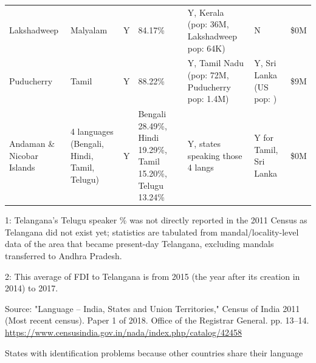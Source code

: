 \documentclass[doublespace,nopageskip]{UVAthesis}
\begin{document}
\begin{appendices}
\begin{table}[htbp]
\begin{threeparttable}
\begin{tabularx}{\textwidth}{@{}Y Y Z Z Y Y Y@{}}
Lakshadweep & Malyalam & Y & 84.17\% & Y, Kerala  (pop: 36M, Lakshadweep pop: 64K) & N & \$0M \\
Puducherry & Tamil & Y & 88.22\% & Y, Tamil Nadu  (pop: 72M, Puducherry pop: 1.4M) & Y, Sri Lanka (US pop: ) & \$9M \\
Andaman \& Nicobar Islands & 4 languages (Bengali, Hindi, Tamil, Telugu)  & Y & Bengali 28.49\%, Hindi 19.29\%, Tamil 15.20\%, Telugu 13.24\% & Y, states speaking those 4 langs & Y for Tamil, Sri Lanka & \$0M \\
\bottomrule
\end{tabularx}

\begin{tablenotes}[flushleft]
\footnotesize
\item 1: Telangana's Telugu speaker \% was not directly reported in the 2011 Census as Telangana did not exist yet; statistics are tabulated from mandal/locality-level data of the area that became present-day Telangana, excluding mandals transferred to Andhra Pradesh.
\item 2: This average of FDI to Telangana is from 2015 (the year after its creation in 2014) to 2017.
\item[Source:] "Language – India, States and Union Territories," Census of India 2011 (Most recent census). Paper 1 of 2018. Office of the Registrar General. pp. 13–14. \url{https://www.censusindia.gov.in/nada/index.php/catalog/42458}
\end{tablenotes}

\end{threeparttable}
\end{table}

\begin{table}[htbp]
\centering
\caption{States with identification problems because other countries share their language}
\label{tab:language_fdi_a2}
\begin{threeparttable}
\footnotesize
{}


\end{threeparttable}
\end{table}
\end{appendices}
\end{document}
